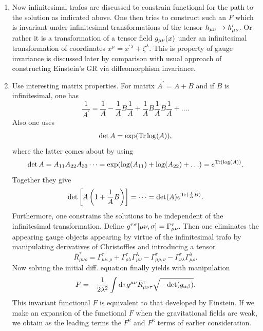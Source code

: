 \begin{enumerate}
\item Now infinitesimal trafos are discussed to constrain functional for the path to the solution as indicated above. One then tries to construct such an $F$ which is invariant under infinitesimal transformations of the tensor $h_{\mu \nu} \rightarrow h^\prime_{\mu \nu}$. Or rather it is a transformation of a tensor field $g_{\mu \nu}(x)$ under an infinitesimal transformation of coordinates $x^\mu = x^{\prime \lambda} + \zeta^\lambda$. This is property of gauge invariance is discussed later by comparison with usual approach of constructing Einstein's GR via diffeomorphism invariance.
\item Use interesting matrix properties. For matrix $A^\prime = A+B$ and if $B$ is infinitesimal, one has
\begin{equation}
	\frac{1}{A^\prime} = \frac{1}{A} - \frac{1}{A }B \frac{1}{A} + \frac{1}{A} B \frac{1}{A} B \frac{1}{A }+\dots.
\end{equation}
Also one uses
\begin{equation}
	\det A = \exp(\mathrm{Tr} \log(A)),
\end{equation}
where the latter comes about by using
\begin{equation}
	\det A = A_{11} A_{22} A_{33} \dots = \exp(\log(A_{11})+\log(A_{22})+\dots) = e^{\mathrm{Tr}(\log(A))}. 
\end{equation}
Together they give
\begin{equation}
	\det\left[A\left(1+\frac{1}{A}B\right)\right] = \dots = \det(A) e^{\mathrm{Tr}(\frac{1}{A}B)}.
\end{equation}
Furthermore, one constrains the solutions to be independent of the infinitesimal transformation.  Define $g^{\tau \sigma} [\mu \nu,\sigma] = \Gamma^\tau_{\mu \nu}$. Then one eliminates the appearing gauge objects appearing by virtue of the infinitesimal trafo by manipulating derivatives of Christoffles and introducing a tensor
\begin{equation}
	\bar{R}^\tau_{\mu \nu \rho} = \Gamma^\tau_{\mu \nu,\rho} + \Gamma^\tau_{\rho \lambda} \Gamma^\lambda_{\mu \nu}-\Gamma^\tau_{\mu \rho, \nu}-\Gamma^\tau_{\nu \lambda} \Gamma^\lambda_{\mu \rho}.
\end{equation}
Now solving the initial diff. equation finally yields with manipulation 
\begin{equation}
	F = -\frac{1}{2 \lambda^2} \int \mathrm{d} \tau g^{\mu \nu} \bar{R}^\tau_{\mu \nu \tau} \sqrt{- \det(g_{\alpha \beta})}.
\end{equation}
This invariant functional $F$ is equivalent to that developed by Einstein. If we make an expansion of the functional $F$ when the gravitational fields are weak, we obtain as the leading terms the $F^2$ and $F^3$ terms of earlier consideration.\\

\end{enumerate}
